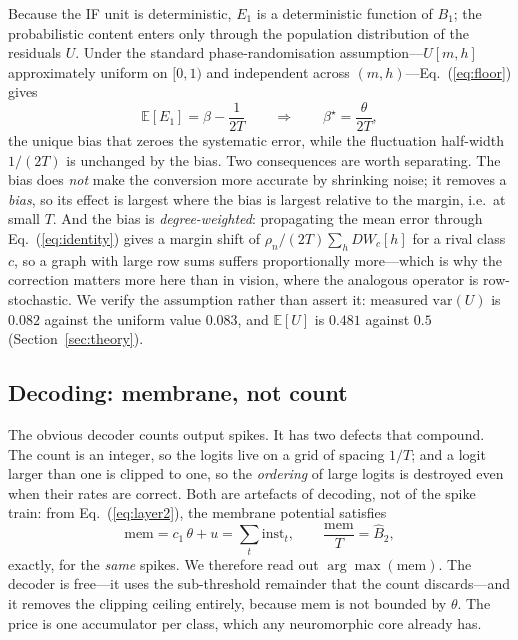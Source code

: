 \documentclass[10pt,twocolumn]{article}
\newcommand{\Bone}{B_{1}}
\newcommand{\Btwohat}{\hat{B}_{2}}
\newcommand{\Eone}{E_{1}}
\newcommand{\betastar}{\beta^{\star}}
\newcommand{\rhon}{\rho_{n}}
\newcommand{\cntone}{c_{1}}
\newcommand{\secref}[1]{Section~\ref{#1}}
\newcommand{\eqnref}[1]{Eq.~(\ref{#1})}
\begin{document}
Because the IF unit is deterministic, $\Eone$ is a deterministic function of $\Bone$; the
probabilistic content enters only through the population distribution of the residuals $U$. Under the
standard phase-randomisation assumption---$U[m,h]$ approximately uniform on $[0,1)$ and independent
across $(m,h)$---\eqnref{eq:floor} gives
\begin{equation}
\mathbb{E}[\Eone] = \beta - \frac{1}{2T}
\qquad\Longrightarrow\qquad
\betastar = \frac{\theta}{2T},
\label{eq:betastar}
\end{equation}
the unique bias that zeroes the systematic error, while the fluctuation half-width $1/(2T)$ is
unchanged by the bias. Two consequences are worth separating. The bias does \emph{not} make the
conversion more accurate by shrinking noise; it removes a \emph{bias}, so its effect is largest where
the bias is largest relative to the margin, i.e.\ at small $T$. And the bias is
\emph{degree-weighted}: propagating the mean error through \eqnref{eq:identity} gives a margin shift
of $\rhon/(2T)\sum_{h} DW_{c}[h]$ for a rival class $c$, so a graph with large row sums suffers
proportionally more---which is why the correction matters more here than in vision, where the
analogous operator is row-stochastic. We verify the assumption rather than assert it: measured
$\mathrm{var}(U)$ is $0.082$ against the uniform value $0.083$, and $\mathbb{E}[U]$ is $0.481$
against $0.5$ (\secref{sec:theory}).

\subsection{Decoding: membrane, not count}
\label{sec:readout}

The obvious decoder counts output spikes. It has two defects that compound. The count is an integer,
so the logits live on a grid of spacing $1/T$; and a logit larger than one is clipped to one, so the
\emph{ordering} of large logits is destroyed even when their rates are correct. Both are artefacts of
decoding, not of the spike train: from \eqnref{eq:layer2}, the membrane potential satisfies
\begin{equation}
\mathrm{mem} = \cntone\,\theta + u = \sum_{t} \mathrm{inst}_{t},
\qquad \frac{\mathrm{mem}}{T} = \Btwohat,
\label{eq:memreadout}
\end{equation}
exactly, for the \emph{same} spikes. We therefore read out $\arg\max(\mathrm{mem})$. The decoder is
free---it uses the sub-threshold remainder that the count discards---and it removes the clipping
ceiling entirely, because $\mathrm{mem}$ is not bounded by $\theta$. The price is one accumulator per
class, which any neuromorphic core already has.
\end{document}
